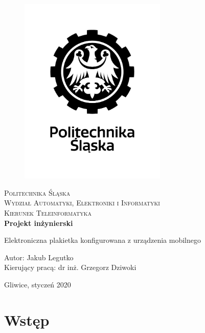 \documentclass[a4paper,12pt, twoside]{article}
\begin{document}
    	\newpage
    	\thispagestyle{empty}
    	\begin{center}
    		
    		\begin{figure}
    			\centering
    			\includegraphics[width=7cm]{images/polsl_logo.jpg}
    			\vspace{.5cm}
    		\end{figure}
    		
    		{\fontsize{17}{17}\selectfont
    			\textsc{Politechnika Śląska \\[.3cm]
    				Wydział Automatyki, Elektroniki i Informatyki  \\[.3cm]
    				Kierunek Teleinformatyka  \\[1.5cm]}
    			\textbf{Projekt inżynierski \\[0.7cm]}}
    		
    		\Large
    		{Elektroniczna plakietka konfigurowana z urządzenia mobilnego \\[3.5cm]}
    		\Large{\begin{flushleft}
    				Autor: Jakub Legutko\\
    				Kierujący pracą: dr inż. Grzegorz Dziwoki\\[0.3cm]
    		\end{flushleft}}
    		
    		\normalsize
    		\vfill Gliwice, styczeń 2020
    	\end{center}
    	\newpage
    	\newpage
    	\thispagestyle{empty}
    	\tableofcontents
    	\newpage
    	\newpage
    	\clearpage
    	\setcounter{page}{1}
    	
    	\section{Wstęp}
    	
\end{document}
